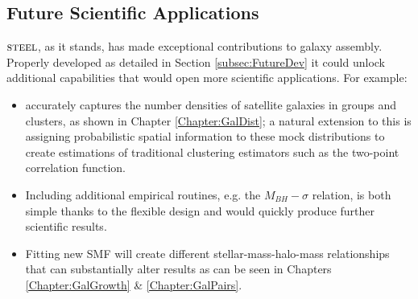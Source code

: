 \subsection{Future Scientific Applications}
$\textsc{steel}$, as it stands, has made exceptional contributions to galaxy assembly. Properly developed as detailed in Section \ref{subsec:FutureDev} it could unlock additional capabilities that would open more scientific applications. For example: 
\begin{itemize}
    \item \steel accurately captures the number densities of satellite galaxies in groups and clusters, as shown in Chapter \ref{Chapter:GalDist}; a natural extension to this is assigning probabilistic spatial information to these mock distributions to create estimations of traditional clustering estimators such as the two-point correlation function. 
    \item Including additional empirical routines, e.g. the $M_{BH}-\sigma$ relation, is both simple thanks to the flexible design and would quickly produce further scientific results.
    \item Fitting new SMF will create different stellar-mass-halo-mass relationships that can substantially alter results as can be seen in Chapters \ref{Chapter:GalGrowth} \& \ref{Chapter:GalPairs}.
\end{itemize}




